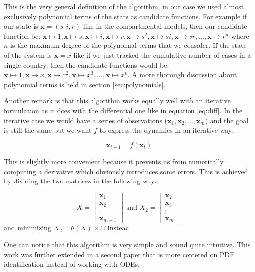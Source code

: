\documentclass[12pt, letterpaper]{article}
\begin{document}
This is the very general definition of the algorithm, in our case we used almost exclusively polynomial terms of the state as candidate functions. 
For example if our state is $\mathbf{x} = (s, i, r)$ like in the compartmental models, then our candidate function be: 
$\mathbf{x} \mapsto 1,
\mathbf{x} \mapsto s,
\mathbf{x} \mapsto i,
\mathbf{x} \mapsto r,
\mathbf{x} \mapsto s^2,
\mathbf{x} \mapsto si,
\mathbf{x} \mapsto sr,
\dots,
\mathbf{x} \mapsto r^n$ where $n$ is the maximum degree of the polynomial terms that we consider. 
If the state of the system is $\mathbf{x} = x$ like if we just tracked the cumulative number of cases in a single country, then the candidate functions would be: $\mathbf{x} \mapsto 1,
\mathbf{x} \mapsto x,
\mathbf{x} \mapsto x^2,
\mathbf{x} \mapsto x^3,
\dots,
\mathbf{x} \mapsto x^n$. 
A more thorough discussion about polynomial terms is held in section \ref{sec:polynomials}.

Another remark is that this algorithm works equally well with an iterative formulation as it does with the differential one like in equation \ref{eq:diff}.
In the iterative case we would have a series of observations ($\mathbf{x}_1, \mathbf{x}_2, \dots, \mathbf{x}_m$) and the goal is still the same but we want $f$ to express the dynamics in an iterative way:

\begin{equation}\label{eq:it}
\mathbf{x}_{t+1} = f(\mathbf{x}_t)
\end{equation}

This is slightly more convenient because it prevents us from numerically computing a derivative which obviously introduces some errors. This is achieved by dividing the two matrices in the following way:


$$X = 
\begin{bmatrix}
\mathbf{x}_1 \\
\mathbf{x}_2 \\
\vdots \\
\mathbf{x}_{m-1}
\end{bmatrix}
\text{ and }
X_2 =
\begin{bmatrix}
\mathbf{x}_2 \\
\mathbf{x}_3 \\
\vdots \\
\mathbf{x}_m
\end{bmatrix}
$$
and minimizing $X_2 = \theta(X) \times \Xi$ instead.

One can notice that this algorithm is very simple and sound quite intuitive.
This work was further extended in a second paper \cite{sindy2} that is more centered on PDE identification instead of working with ODEs. 
\end{document}
